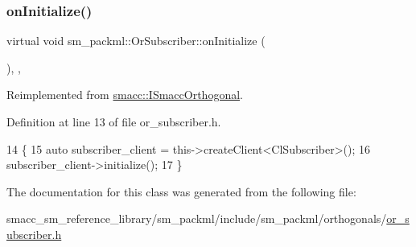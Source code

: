 \subsubsection{\texorpdfstring{on\+Initialize()}{onInitialize()}}
{\footnotesize\ttfamily virtual void sm\+\_\+packml\+::\+Or\+Subscriber\+::on\+Initialize (\begin{DoxyParamCaption}{ }\end{DoxyParamCaption})\hspace{0.3cm}{\ttfamily [inline]}, {\ttfamily [override]}, {\ttfamily [virtual]}}



Reimplemented from \hyperlink{classsmacc_1_1ISmaccOrthogonal_a6bb31c620cb64dd7b8417f8705c79c7a}{smacc\+::\+I\+Smacc\+Orthogonal}.



Definition at line 13 of file or\+\_\+subscriber.\+h.


\begin{DoxyCode}
14     \{
15         \textcolor{keyword}{auto} subscriber\_client = this->createClient<ClSubscriber>();
16         subscriber\_client->initialize();
17     \}
\end{DoxyCode}


The documentation for this class was generated from the following file\+:\begin{DoxyCompactItemize}
\item 
smacc\+\_\+sm\+\_\+reference\+\_\+library/sm\+\_\+packml/include/sm\+\_\+packml/orthogonals/\hyperlink{sm__packml_2include_2sm__packml_2orthogonals_2or__subscriber_8h}{or\+\_\+subscriber.\+h}\end{DoxyCompactItemize}
